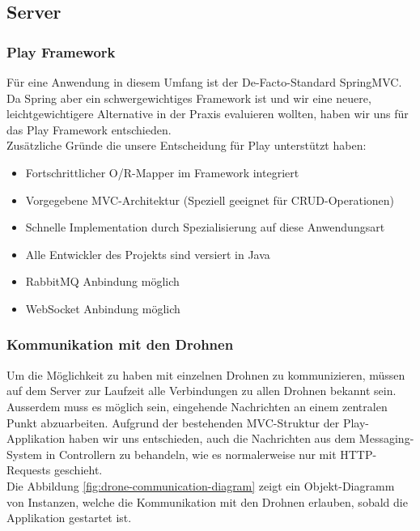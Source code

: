 \subsection{Server}

\subsubsection{Play Framework}
Für eine Anwendung in diesem Umfang ist der De-Facto-Standard SpringMVC. Da Spring aber ein schwergewichtiges Framework ist und wir eine neuere, leichtgewichtigere Alternative in der Praxis evaluieren wollten, haben wir uns für das Play Framework entschieden.
\\
Zusätzliche Gründe die unsere Entscheidung für Play unterstützt haben:

\begin{itemize}
    \item Fortschrittlicher O/R-Mapper im Framework integriert
    \item Vorgegebene MVC-Architektur (Speziell geeignet für \Gls{CRUD}-Operationen)
    \item Schnelle Implementation durch Spezialisierung auf diese Anwendungsart 
    \item Alle Entwickler des Projekts sind versiert in Java
    \item RabbitMQ Anbindung möglich
    \item WebSocket Anbindung möglich
\end{itemize}

\subsubsection{Kommunikation mit den Drohnen}

Um die Möglichkeit zu haben mit einzelnen Drohnen zu kommunizieren, müssen auf dem Server zur Laufzeit alle Verbindungen zu allen Drohnen bekannt sein. Ausserdem muss es möglich sein, eingehende Nachrichten an einem zentralen Punkt abzuarbeiten. Aufgrund der bestehenden MVC-Struktur der Play-Applikation haben wir uns entschieden, auch die Nachrichten aus dem Messaging-System in Controllern zu behandeln, wie es normalerweise nur mit HTTP-Requests geschieht.\\

Die Abbildung \ref{fig:drone-communication-diagram} zeigt ein Objekt-Diagramm von Instanzen, welche die Kommunikation mit den Drohnen erlauben, sobald die Applikation gestartet ist.

